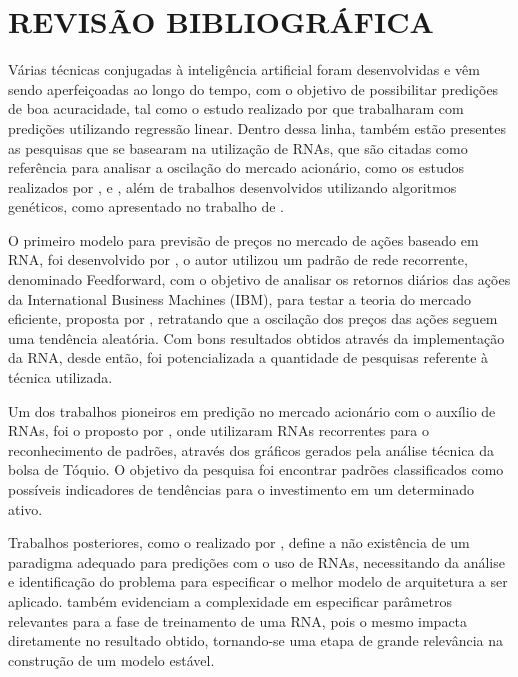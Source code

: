 
\chapter{REVISÃO BIBLIOGRÁFICA}\label{ch:rev-bibs}

Várias técnicas conjugadas à inteligência artificial foram desenvolvidas e vêm sendo aperfeiçoadas ao longo do tempo, com o objetivo de possibilitar predições de boa acuracidade, tal como o estudo realizado por  que trabalharam com predições utilizando regressão linear. Dentro dessa linha, também estão presentes as pesquisas que se basearam na utilização de RNAs, que são citadas como referência para analisar a oscilação do mercado acionário, como os estudos realizados por ,  e , além de trabalhos desenvolvidos utilizando algoritmos genéticos, como apresentado no trabalho de .

O primeiro modelo para previsão de preços no mercado de ações baseado em RNA, foi desenvolvido por , o autor utilizou um padrão de rede recorrente, denominado Feedforward, com o objetivo de analisar os retornos diários das ações da International Business Machines (IBM), para testar a teoria do mercado eficiente, proposta por , retratando que a oscilação dos preços das ações seguem uma tendência aleatória. Com bons resultados obtidos através da implementação da RNA, desde então, foi potencializada a quantidade de pesquisas referente à técnica utilizada.

Um dos trabalhos pioneiros em predição no mercado acionário com o auxílio de RNAs, foi o proposto por , onde utilizaram RNAs recorrentes para o reconhecimento de padrões, através dos gráficos gerados pela análise técnica da bolsa de Tóquio. O objetivo da pesquisa foi encontrar padrões classificados como possíveis indicadores de tendências para o investimento em um determinado ativo.  

Trabalhos posteriores, como o realizado por , define a não existência de um paradigma adequado para predições com o uso de RNAs, necessitando da análise e identificação do problema para especificar o melhor modelo de arquitetura a ser aplicado.  também evidenciam a complexidade em especificar parâmetros relevantes para a fase de treinamento de uma RNA, pois o mesmo impacta diretamente no resultado obtido, tornando-se uma etapa de grande relevância na construção de um modelo estável.

